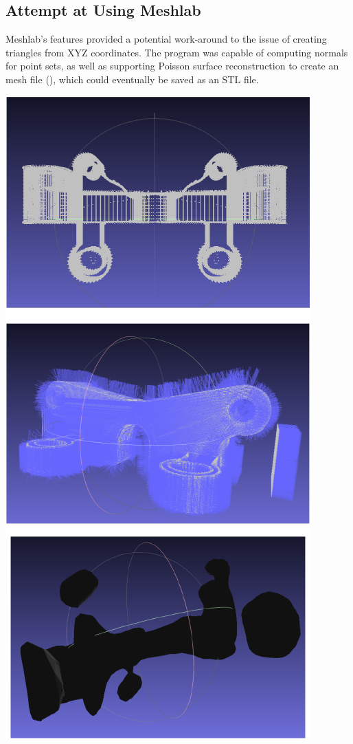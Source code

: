 \documentclass[11pt, A4paper]{article}
\begin{document}
\begin{multicols}{2}
\section{Attempt at Using Meshlab}

Meshlab's features provided a potential work-around to the issue of creating triangles from XYZ coordinates. The program was capable of computing normals for point sets, as well as supporting Poisson surface reconstruction to create an mesh file (\cite[]{poisson}), which could eventually be saved as an STL file.

\begingroup
    \bigskip
    \centering
    \includegraphics[width=\columnwidth]{meshlab}

\end{multicols}
\end{document}
